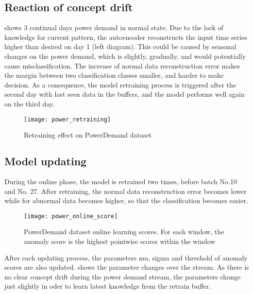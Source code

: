 \subsection{Reaction of concept drift}
\label{sec:reaction}

 shows 3 continual days power demand in normal state. Due to the lack of knowledge for current pattern, the autoencoder reconstructs the input time series higher than desired on day 1 (left diagram). This could be caused by seasonal changes on the power demand, which is slightly, gradually, and would potentially cause misclassification. The increase of normal data reconstruction error makes the margin between two classification classes smaller, and harder to make decision. As a consequence, the model retraining process is triggered after the second day with last seen data in the buffers, and the model performs well again on the third day.

\begin{figure}[h]
\centering
\texttt{[image: power\_retraining]}
\caption[Retraining effect on PowerDemand dataset]{Retraining effect on PowerDemand dataset}
\label{fig:power_retraining}
\end{figure}

\subsection{Model updating}
\label{sec:retrainig}

During the online phase, the model is retrained two times, before batch No.10 and No. 27. After retraining, the normal data reconstruction error becomes lower while for abnormal data becomes higher, so that the classification becomes easier.

\begin{figure}[h]
\centering
\texttt{[image: power\_online\_score]}
\caption[PowerDemand dataset online learning scores]{PowerDemand dataset online learning scores. For each window, the anomaly score is the highest pointwise scores within the window}
\label{fig:power_online}
\end{figure}

After each updating process, the parameters mu, sigma and threshold of anomaly scores are also updated.  shows the parameter changes over the stream. As there is no clear concept drift during the power demand stream, the parameters change just slightly in oder to learn latest knowledge from the retrain buffer. 

